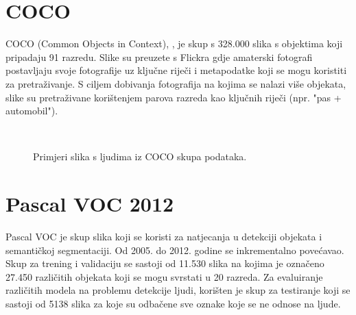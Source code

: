 \section{COCO}
COCO (Common Objects in Context), \cite{DBLP:journals/corr/LinMBHPRDZ14}, je skup s 328.000 slika s objektima koji pripadaju 91 razredu. Slike su preuzete s Flickra gdje amaterski fotografi postavljaju svoje fotografije uz ključne riječi i metapodatke koji se mogu koristiti za pretraživanje. S ciljem dobivanja fotografija na kojima se nalazi više objekata, slike su pretraživane korištenjem parova razreda kao ključnih riječi (npr. "pas + automobil").

\begin{figure}[h]
 \
 \
\caption{Primjeri slika s ljudima iz COCO skupa podataka.}
\end{figure}

\section{Pascal VOC 2012}
Pascal VOC je skup slika koji se koristi za natjecanja u detekciji objekata i semantičkoj segmentaciji. Od 2005. do 2012. godine se inkrementalno povećavao. Skup za trening i validaciju se sastoji od 11.530 slika na kojima je označeno 27.450 različitih objekata koji se mogu svrstati u 20 razreda. Za evaluiranje različitih modela na problemu detekcije ljudi, korišten je skup za testiranje koji se sastoji od 5138 slika za koje su odbačene sve oznake koje se ne odnose na ljude.


